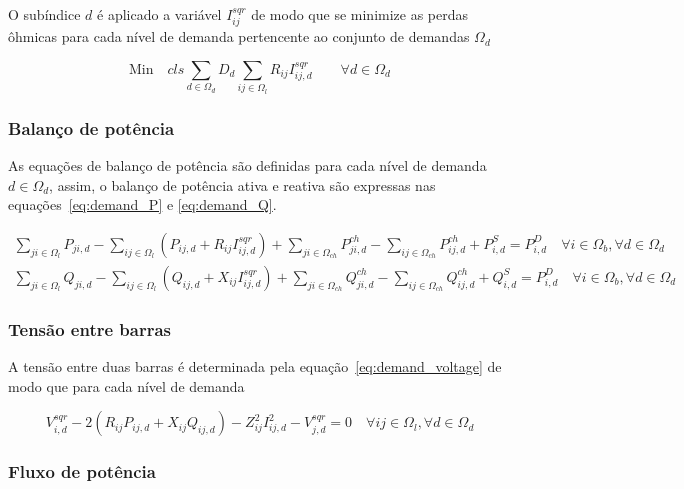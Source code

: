 O subíndice $d$ é aplicado a variável $I_{ij}^{sqr}$ de modo que se minimize as perdas ôhmicas para cada nível de demanda pertencente ao conjunto de demandas $\Omega_d$

\begin{equation}\label{eq:demand_objec}
    \text{Min}\quad cls\sum_{d\in\Omega_d}D_d\sum_{ij\in\Omega_l}R_{ij}I_{ij,d}^{sqr}\qquad\forall d\in\Omega_d
\end{equation}

\subsubsection{Balanço de potência}

As equações de balanço de potência são definidas para cada nível de demanda $d\in\Omega_d$, assim, o balanço de potência ativa e reativa são expressas nas equações~\eqref{eq:demand_P} e \eqref{eq:demand_Q}.

\begin{align}\label{eq:demand_P}
    \sum_{ji\in\Omega_{l}}P_{ji,d} - \sum_{ij\in\Omega_{l}}(P_{ij,d} + R_{ij}I_{ij,d}^{sqr})+ \sum_{ji\in\Omega_{ch}}P_{ji,d}^{ch} -\sum_{ij\in\Omega_{ch}}P_{ij,d}^{ch} + P_{i,d}^{S} = P_{i,d}^{D}\quad\forall i \in\Omega_{b},\forall d\in\Omega_d\\
    \label{eq:demand_Q}
    \sum_{ji\in\Omega_{l}}Q_{ji,d} - \sum_{ij\in\Omega_{l}}(Q_{ij,d} + X_{ij}I_{ij,d}^{sqr})+ \sum_{ji\in\Omega_{ch}}Q_{ji,d}^{ch} -\sum_{ij\in\Omega_{ch}}Q_{ij,d}^{ch} + Q_{i,d}^{S} = P_{i,d}^{D}\quad\forall i \in\Omega_{b},\forall d\in\Omega_d
\end{align}

\subsubsection{Tensão entre barras}

A tensão entre duas barras é determinada pela equação~\eqref{eq:demand_voltage} de modo que para cada nível de demanda 

\begin{equation}\label{eq:demand_voltage}
    V_{i,d}^{sqr} - 2(R_{ij}P_{ij,d} + X_{ij}Q_{ij,d}) - Z_{ij}^{2}I_{ij,d}^{2} - V_{j,d}^{sqr} = 0\quad\forall ij \in \Omega_{l},\forall d\in\Omega_d
\end{equation}

\subsubsection{Fluxo de potência}

